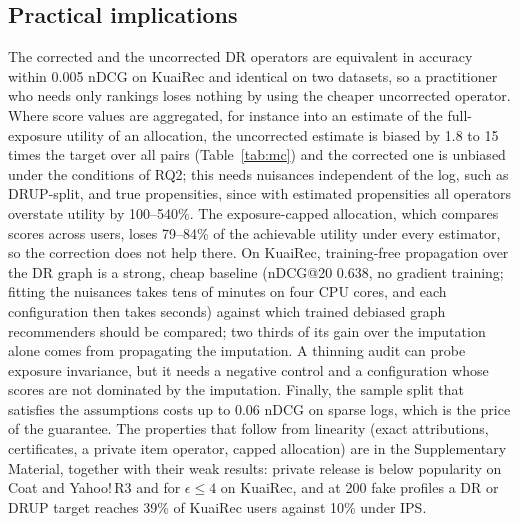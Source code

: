 \documentclass[preprint,review,12pt,authoryear]{elsarticle}
\theoremstyle{definition}
\begin{document}
\subsection{Practical implications}
The corrected and the uncorrected DR operators are equivalent in accuracy within
0.005 nDCG on KuaiRec and identical on two datasets, so a practitioner who needs only
rankings loses nothing by using the cheaper uncorrected operator. Where score values are
aggregated, for instance into an estimate of the full-exposure utility of an allocation,
the uncorrected estimate is biased by 1.8 to 15 times the target over all pairs
(Table~\ref{tab:mc}) and the corrected one is unbiased under the conditions of RQ2; this
needs nuisances independent of the log, such as DRUP-split, and true propensities, since
with estimated propensities all operators overstate utility by 100--540\%. The
exposure-capped allocation, which compares scores across users, loses 79--84\% of the
achievable utility under every estimator, so the correction does not help there. On
KuaiRec, training-free propagation over the DR graph is a strong, cheap baseline
(nDCG@20 0.638, no gradient training; fitting the nuisances takes tens of minutes on four CPU
cores, and each configuration then takes seconds) against which trained debiased graph recommenders should be compared;
two thirds of its gain over the imputation alone comes from propagating the imputation.
A thinning audit can probe exposure invariance, but it needs a negative control and a
configuration whose scores are not dominated by the imputation. Finally, the sample
split that satisfies the assumptions costs up to 0.06 nDCG on sparse logs, which is the
price of the guarantee. The properties that follow from linearity (exact attributions,
certificates, a private item operator, capped allocation) are in the Supplementary
Material, together with their weak results: private release is below popularity on
Coat and Yahoo!\,R3 and for $\epsilon\le4$ on KuaiRec, and at 200 fake profiles a DR or
DRUP target reaches 39\% of KuaiRec users against 10\% under IPS.
\end{document}

